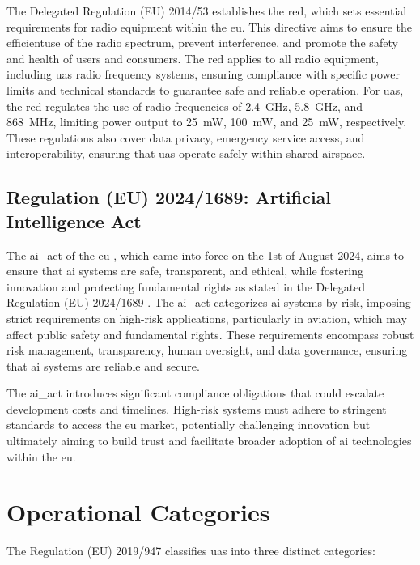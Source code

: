 The Delegated Regulation (EU) 2014/53 \autocite{eu-53-2014} establishes the \gls{red}, which sets essential requirements for radio equipment within the \gls{eu}. This directive aims to ensure the efficientuse of the radio spectrum, prevent interference, and promote the safety and health of users and consumers. The \gls{red} applies to all radio equipment, including \gls{uas} radio frequency systems, ensuring compliance with specific power limits and technical standards to guarantee safe and reliable operation. For \gls{uas}, the \gls{red} regulates the use of radio frequencies of \SI{2.4}{\giga\hertz}, \SI{5.8}{\giga\hertz}, and \SI{868}{\mega\hertz}, limiting power output to \SI{25}{\milli\watt}, \SI{100}{\milli\watt}, and \SI{25}{\milli\watt}, respectively. These regulations also cover data privacy, emergency service access, and interoperability, ensuring that \gls{uas} operate safely within shared airspace.

\subsection{Regulation (EU) 2024/1689: Artificial Intelligence Act}
The \gls{ai_act} of the \gls{eu} \autocite{AIActIntoForce}, which came into force on the 1st of August 2024, aims to ensure that \gls{ai} systems are safe, transparent, and ethical, while fostering innovation and protecting fundamental rights as stated in the Delegated Regulation (EU) 2024/1689 \autocite{eu-1689-2024}. The \gls{ai_act} categorizes \gls{ai} systems by risk, imposing strict requirements on high-risk applications, particularly in aviation, which may affect public safety and fundamental rights. These requirements encompass robust risk management, transparency, human oversight, and data governance, ensuring that \gls{ai} systems are reliable and secure.

The \gls{ai_act} introduces significant compliance obligations that could escalate development costs and timelines. High-risk systems must adhere to stringent standards to access the \gls{eu} market, potentially challenging innovation but ultimately aiming to build trust and facilitate broader adoption of \gls{ai} technologies within the \gls{eu}.

\section{Operational Categories}
The Regulation (EU) 2019/947 \autocite{eu-947-2019} classifies \gls{uas} into three distinct categories:

